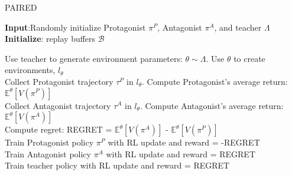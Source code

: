 \begin{algorithm}[H]
\caption{PAIRED}
\label{alg:paired}
\textbf{Input}:Randomly initialize Protagonist $\pi^P$, Antagonist $\pi^A$, and teacher $\Lambda$ \\
\textbf{Initialize}: replay buffers $\mathcal{B}$ 
\begin{algorithmic}[1]
\STATE Use teacher to generate environment parameters: $\theta \sim \Lambda$. Use $\theta$ to create environments, $l_{\theta}$ \\
\STATE Collect Protagonist trajectory $\tau^P$ in $l_{\theta}$. Compute Protagonist's average return: $\mathbb{E}^{\theta}[V(\pi^P)]$ \\
\STATE Collect Antagonist trajectory $\tau^A$ in $l_{\theta}$. Compute Antagonist's average return: $\mathbb{E}^{\theta}[V(\pi^A)]$ \\
\STATE Compute regret: REGRET = $\mathbb{E}^{\theta}[V(\pi^A)]$ - $\mathbb{E}^{\theta}[V(\pi^P)]$ \\

\STATE Train Protagonist policy $\pi^P$ with RL update and reward = -REGRET \\
\STATE Train Antagonist policy $\pi^A$ with RL update and reward = REGRET  \\
\STATE Train teacher policy  with RL update and reward = REGRET 
\ENDWHILE
\end{algorithmic}
\end{algorithm}


